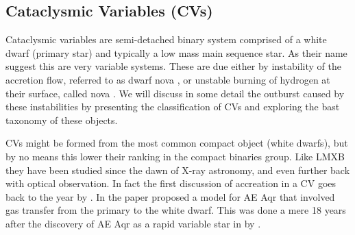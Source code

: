 \subsection{Cataclysmic Variables (CVs)}

Cataclysmic variables are semi-detached binary system comprised of a white dwarf (primary star) and typically a low mass main sequence star. As their name suggest this are very variable systems. These are due either by instability of the accretion flow, referred to as dwarf nova \citep{osaki_accretion_1974}, or unstable burning of hydrogen at their surface, called nova \citep{starrfield_thermonuclear_2016}. We will discuss in some detail the outburst caused by these instabilities by presenting the classification of CVs and exploring the bast taxonomy of these objects.  



CVs might be formed from the most common compact object (white dwarfs), but by no means this lower their ranking in the compact binaries group. Like LMXB they have been studied since the dawn of X-ray astronomy, and even further back with optical observation. In fact the first discussion of accreation in a CV goes back to the year \citeyear{crawford_intrepretation_1956} by \citeauthor{crawford_intrepretation_1956}. In the paper \citeauthor{crawford_intrepretation_1956} proposed a model for AE Aqr that involved gas transfer from the primary to the white dwarf. This was done a mere 18 years after the discovery of AE Aqr as a rapid variable star in \citeyear{zinner_mitteilungen_1938} by \citeauthor{zinner_mitteilungen_1938}.  

